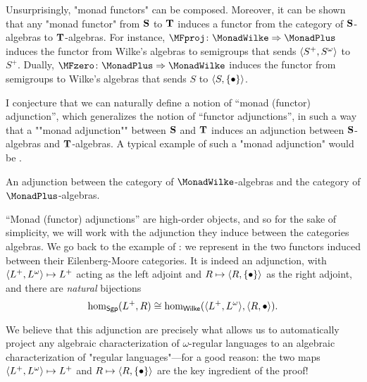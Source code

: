 Unsurprisingly, "monad functors" can be composed. Moreover, 
it can be shown that any "monad functor" from $\Monad[S]$ to $\Monad[T]$ induces
a functor from the category of $\Monad[S]$-algebras to $\Monad[T]$-algebras.
For instance, $\MFproj\colon \MonadWilke \Rightarrow \MonadPlus$ induces
the functor from Wilke's algebras to semigroups that sends $\tup{S^+,S^\omega}$
to $S^+$.
Dually, $\MFzero\colon \MonadPlus \Rightarrow \MonadWilke$ induces the functor
from semigroups to Wilke's algebras that sends $S$ to $\tup{S, \set{\bullet}}$.

I conjecture that we can naturally define a notion of ``monad (functor) adjunction'',
which generalizes the notion of ``functor adjunctions'',
in such a way that a \AP""monad adjunction"" between $\Monad[S]$ and $\Monad[T]$
induces an adjunction between $\Monad[S]$-algebras and $\Monad[T]$-algebras.
A typical example of such a "monad adjunction" would be
.

\begin{marginfigure}
	\centering
	\begin{tikzpicture}
		
	\end{tikzpicture}
	\caption{
		\AP\label{fig:adjunction-formal-finite-wilke}
		An adjunction between the category of
		$\MonadWilke$-algebras and the category of $\MonadPlus$-algebras.
	}
\end{marginfigure}
``Monad (functor) adjunctions'' are high-order objects, and so for the sake
of simplicity, we will work with the adjunction they induce between the categories
algebras. We go back to the example of :
we represent in  the two functors induced
between their Eilenberg-Moore categories.
It is indeed an adjunction, with $\tup{L^+, L^\omega} \mapsto L^+$ acting as the left
adjoint and $R \mapsto \tup{R,\set{\bullet}}$ as the right adjoint, and there
are \emph{natural} bijections
\[
	\textrm{hom}_{\cat{Sgp}}(L^+, R)
	\cong \textrm{hom}_{\cat{Wilke}}(\tup{L^+,L^\omega}, \tup{R,\bullet}).
\]

We believe that this adjunction are precisely what allows us to automatically project
any algebraic characterization of $\omega$-regular languages to an algebraic
characterization of "regular languages"---for a good reason: 
the two maps $\tup{L^+, L^\omega} \mapsto L^+$ and $R \mapsto \tup{R,\set{\bullet}}$
are the key ingredient of the proof!

